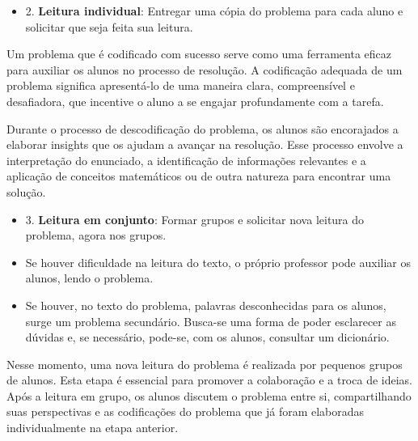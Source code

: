 
\begin{itemize}
    \item 2. \textbf{Leitura individual}: Entregar uma cópia do problema para cada aluno e solicitar que seja feita sua leitura. \cite{BOLEMAAllevatoOnuchic2011}
\end{itemize}

Um problema que é codificado com sucesso serve como uma ferramenta eficaz para auxiliar os alunos no processo de resolução. A codificação adequada de um problema significa apresentá-lo de uma maneira clara, compreensível e desafiadora, que incentive o aluno a se engajar profundamente com a tarefa.

Durante o processo de descodificação do problema, os alunos são encorajados a elaborar insights que os ajudam a avançar na resolução. Esse processo envolve a interpretação do enunciado, a identificação de informações relevantes e a aplicação de conceitos matemáticos ou de outra natureza para encontrar uma solução.


\begin{itemize}
    \item 3. \textbf{Leitura em conjunto}: Formar grupos e solicitar nova leitura do problema, agora nos grupos. \cite{BOLEMAAllevatoOnuchic2011}
\end{itemize}

\begin{citacao}
    \begin{itemize}
        \item Se houver dificuldade na leitura do texto, o próprio professor pode auxiliar os alunos, lendo o problema.
        \item Se houver, no texto do problema, palavras desconhecidas para os alunos, surge um problema secundário. Busca-se uma forma de poder esclarecer as dúvidas e, se necessário, pode-se, com os alunos, consultar um dicionário.
    \end{itemize}
    \cite{BOLEMAAllevatoOnuchic2011}
\end{citacao}

Nesse momento, uma nova leitura do problema é realizada por pequenos grupos de alunos. Esta etapa é essencial para promover a colaboração e a troca de ideias. Após a leitura em grupo, os alunos discutem o problema entre si, compartilhando suas perspectivas e as codificações do problema que já foram elaboradas individualmente na etapa anterior.

